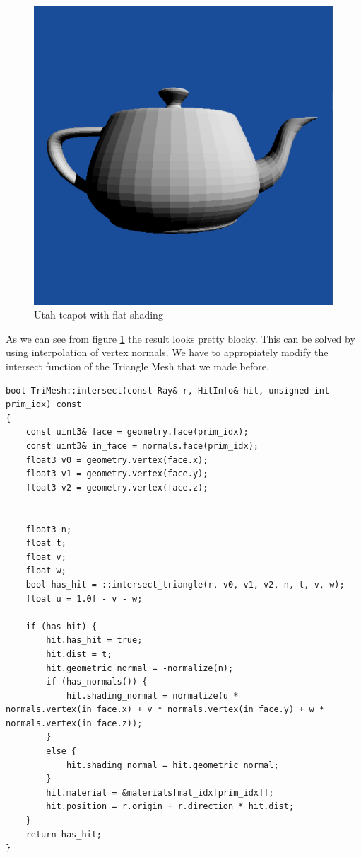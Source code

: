 \begin{figure}[H]
	\centering
	\includegraphics[scale=\imagescale]{images/worksheet_4/part4_after_rendering}
	\caption{Utah teapot with flat shading}
	\label{fig:utah_lambertian}
\end{figure}
As we can see from figure \ref{fig:utah_lambertian} the result looks pretty blocky. This can be solved by using interpolation of vertex normals. We have to appropiately modify the intersect function of the Triangle Mesh that we made before.
\begin{lstlisting}
bool TriMesh::intersect(const Ray& r, HitInfo& hit, unsigned int prim_idx) const
{
	const uint3& face = geometry.face(prim_idx);
	const uint3& in_face = normals.face(prim_idx);
	float3 v0 = geometry.vertex(face.x);
	float3 v1 = geometry.vertex(face.y);
	float3 v2 = geometry.vertex(face.z);
	
	
	float3 n;
	float t;
	float v;
	float w;
	bool has_hit = ::intersect_triangle(r, v0, v1, v2, n, t, v, w);
	float u = 1.0f - v - w;
	
	if (has_hit) {
		hit.has_hit = true;
		hit.dist = t;
		hit.geometric_normal = -normalize(n);
		if (has_normals()) {
			hit.shading_normal = normalize(u * normals.vertex(in_face.x) + v * normals.vertex(in_face.y) + w * normals.vertex(in_face.z));
		}
		else {
			hit.shading_normal = hit.geometric_normal;
		}
		hit.material = &materials[mat_idx[prim_idx]];
		hit.position = r.origin + r.direction * hit.dist;
	}
	return has_hit;
}
\end{lstlisting}

